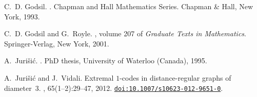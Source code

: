 \documentclass[a4paper,11pt]{article}
\newcommand{\doi}[1]{\href{http://dx.doi.org/#1}{\texttt{doi:#1}}}
\begin{document}
\begin{footnotesize}
\begin{thebibliography}{10}
C.~D. Godsil.
.
\newblock Chapman and Hall Mathematics Series. Chap\-man \& Hall, New York,
1993.

C.~D. Godsil and G.~Royle.
, volume 207 of {\em Graduate Texts in
Mathematics}.
\newblock Springer-Verlag, New York, 2001.


A.~Jurišić.
.
\newblock PhD thesis, University of Waterloo (Canada), 1995.

A.~Jurišić and J.~Vidali.
\newblock Extremal $1$-codes in distance-regular graphs of dia\-meter~$3$.
, 65(1--2):29--47, 2012.
\newblock \doi{10.1007/s10623-012-9651-0}.

\end{thebibliography}
\end{footnotesize}
\end{document}
